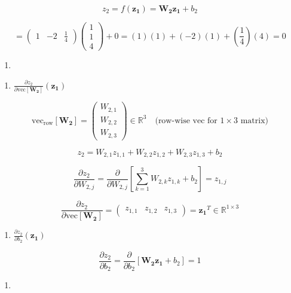 \documentclass[
  letterpaper,
  DIV=11,
  numbers=noendperiod]{scrartcl}
\providecommand{\tightlist}{%
  \setlength{\itemsep}{0pt}\setlength{\parskip}{0pt}}\usepackage{longtable,booktabs,array}
\begin{document}
\[z_2 = f(\mathbf{z_1}) = \mathbf{W_2}\mathbf{z_1} + b_2\]

\[= \begin{pmatrix}1 & -2 & \frac{1}{4}\end{pmatrix}\begin{pmatrix}1\\1\\4\end{pmatrix} + 0 = (1)(1) + (-2)(1) + \left(\frac{1}{4}\right)(4) = 0\]

\begin{enumerate}
\def\labelenumi{\arabic{enumi}.}
\setcounter{enumi}{4}
\tightlist
\item
\end{enumerate}

\begin{enumerate}
\def\labelenumi{(\alph{enumi})}
\tightlist
\item
  \(\frac{\partial z_2}{\partial \text{vec}[\mathbf{W_2}]}(\mathbf{z_1})\)
\end{enumerate}

\[\text{vec}_{\text{row}}[\mathbf{W_2}] = \begin{pmatrix}W_{2,1}\\W_{2,2}\\W_{2,3}\end{pmatrix} \in \mathbb{R}^3 \quad \text{(row-wise vec for } 1 \times 3 \text{ matrix)}\]

\[z_2 = W_{2,1}z_{1,1} + W_{2,2}z_{1,2} + W_{2,3}z_{1,3} + b_2\]

\[\frac{\partial z_2}{\partial W_{2,j}} = \frac{\partial}{\partial W_{2,j}}\left[\sum_{k=1}^3 W_{2,k}z_{1,k} + b_2\right] = z_{1,j}\]

\[\frac{\partial z_2}{\partial \text{vec}[\mathbf{W_2}]} = \begin{pmatrix}z_{1,1} & z_{1,2} & z_{1,3}\end{pmatrix} = \mathbf{z_1}^T \in \mathbb{R}^{1 \times 3}\]

\begin{enumerate}
\def\labelenumi{(\alph{enumi})}
\setcounter{enumi}{1}
\tightlist
\item
  \(\frac{\partial z_2}{\partial b_2}(\mathbf{z_1})\)
\end{enumerate}

\[\frac{\partial z_2}{\partial b_2} = \frac{\partial}{\partial b_2}[\mathbf{W_2}\mathbf{z_1} + b_2] = 1\]

\begin{enumerate}
\def\labelenumi{\arabic{enumi}.}
\setcounter{enumi}{5}
\tightlist
\item
\end{enumerate}
\end{document}
